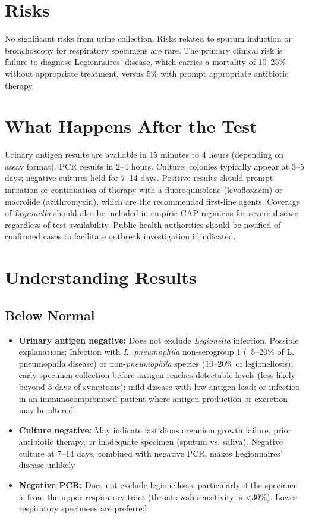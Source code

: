 \section*{Risks}
No significant risks from urine collection. Risks related to sputum induction or bronchoscopy for respiratory specimens are rare. The primary clinical risk is failure to diagnose Legionnaires' disease, which carries a mortality of 10--25\% without appropriate treatment, versus 5\% with prompt appropriate antibiotic therapy.

\section*{What Happens After the Test}
Urinary antigen results are available in 15 minutes to 4 hours (depending on assay format). PCR results in 2--4 hours. Culture: colonies typically appear at 3--5 days; negative cultures held for 7--14 days. Positive results should prompt initiation or continuation of therapy with a fluoroquinolone (levofloxacin) or macrolide (azithromycin), which are the recommended first-line agents. Coverage of \textit{Legionella} should also be included in empiric CAP regimens for severe disease regardless of test availability. Public health authorities should be notified of confirmed cases to facilitate outbreak investigation if indicated.

\section*{Understanding Results}

\subsection*{Below Normal}
\begin{itemize}
  \item \textbf{Urinary antigen negative:} Does not exclude \textit{Legionella} infection. Possible explanations: Infection with \textit{L. pneumophila} non-serogroup 1 (~5--20\% of L. pneumophila disease) or non-\textit{pneumophila} species (10--20\% of legionellosis); early specimen collection before antigen reaches detectable levels (less likely beyond 3 days of symptoms); mild disease with low antigen load; or infection in an immunocompromised patient where antigen production or excretion may be altered
  \item \textbf{Culture negative:} May indicate fastidious organism growth failure, prior antibiotic therapy, or inadequate specimen (sputum vs. saliva). Negative culture at 7--14 days, combined with negative PCR, makes Legionnaires' disease unlikely
  \item \textbf{Negative PCR:} Does not exclude legionellosis, particularly if the specimen is from the upper respiratory tract (throat swab sensitivity is <30\%). Lower respiratory specimens are preferred
\end{itemize}


